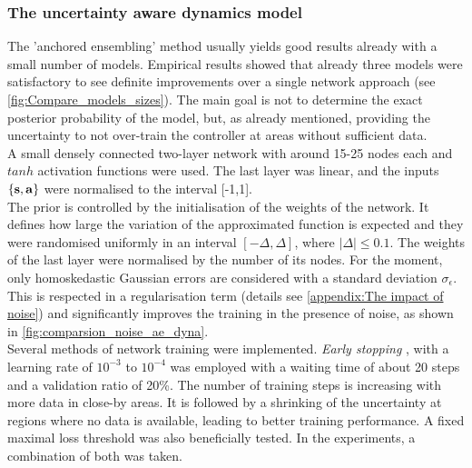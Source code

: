 \documentclass[
reprint,
amsmath,amssymb,amsfonts,clevref,
aps,
prstab,
]{revtex4-2}
\begin{document}
	\subsubsection{The uncertainty aware dynamics model}\label{ss:The uncertainty aware dynamics model}
	The 'anchored ensembling' method usually yields good results already with a small number of models. Empirical results showed that already three models were satisfactory to see definite improvements over a single network approach (see \cref{fig:Compare_models_sizes}). The main goal is not to determine the exact posterior probability of the model, but, as already mentioned, providing the uncertainty to not over-train the controller at areas without sufficient data.\\
	A small densely connected two-layer network with around 15-25 nodes each and $tanh$ activation functions were used. The last layer was linear, and the inputs $\{\mathbf{s},\mathbf{a}\}$ were normalised to the interval [-1,1].\\
	The prior is controlled by the initialisation of the weights of the network. It defines how large the variation of the approximated function is expected and they were randomised uniformly in an interval $[-\Delta, \Delta]$, where $|\Delta|\leq0.1$. The weights of the last layer were normalised by the number of its nodes. For the moment, only homoskedastic Gaussian errors are considered with a standard deviation $\sigma_\epsilon$. This is respected in a regularisation term (details see \cref{appendix:The impact of noise}) and significantly improves the training in the presence of noise, as shown in \cref{fig:comparsion_noise_ae_dyna}. \\
	Several methods of network training were implemented. \emph{Early stopping} \cite{Goodfellow2016}, with a learning rate of $10^{-3}$ to $10^{-4}$  was employed with a waiting time of about 20 steps and a validation ratio of 20\%. The number of training steps is increasing with more data in close-by areas. It is followed by a shrinking of the uncertainty at regions where no data is available, leading to better training performance. A fixed maximal loss threshold was also beneficially tested. In the experiments, a combination of both was taken.
\end{document}
